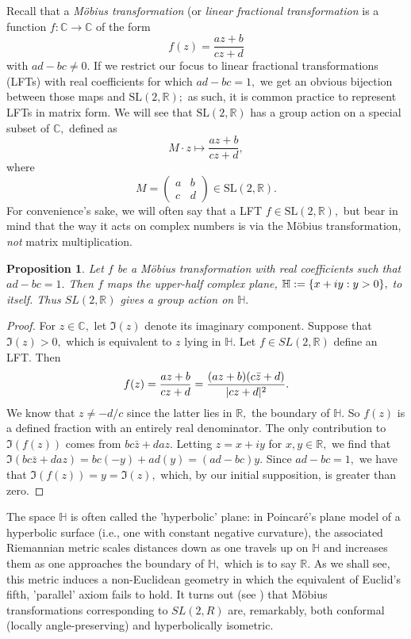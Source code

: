 \documentclass[12pt, letterpaper, oneside]{book}
\newcommand{\C}{\mathbb{C}}
\newcommand{\R}{\mathbb{R}}
\DeclarePairedDelimiter{\abs}{\lvert}{\rvert}
\DeclarePairedDelimiter{\set}{\lbrace}{\rbrace}
\theoremstyle{plain}
\newtheorem{tion}{Proposition}
\theoremstyle{definition}
\theoremstyle{remark}
\begin{document}
Recall that a \textit{M\"obius transformation} (or \textit{linear fractional transformation} is a function $f:\C \to \C$ of the form
\[
f(z) = \frac{az + b}{cz+d}
\]
with $ad - bc \neq 0.$  If we restrict our focus to linear fractional transformations (LFTs) with real coefficients for which $ad - bc = 1,$ we get an obvious bijection between those maps and $\mbox{SL}(2,\R);$ as such, it is common practice to represent LFTs in matrix form. We will see that $\mbox{SL}(2,\R)$ has a group action on a special subset of $\C,$ defined as
\[
M\cdot z \mapsto \frac{az + b}{cz+d},
\]
where
\[
M = \begin{pmatrix} a & b \\ c & d \end{pmatrix} \in \mbox{SL}(2,\R).
\]
For convenience's sake, we will often say that a LFT $f \in \mbox{SL}(2,\R),$ but bear in mind that the way it acts on complex numbers is via the M\"obius transformation, \textit{not} matrix multiplication.
\begin{tion}
Let $f$ be a M\"obius transformation with real coefficients such that $ad - bc = 1.$ Then $f$ maps the upper-half complex plane, $\mathbb{H} := \set{x + iy: y > 0},$ to itself. Thus $SL(2,\R)$ gives a group action on $\mathbb{H}.$
\end{tion}
\begin{proof}
For $z \in \C,$ let $\Im(z)$ denote its imaginary component. Suppose that $\Im(z) > 0,$ which is equivalent to $z$ lying in $\mathbb{H}.$ Let $f \in SL(2,\R)$ define an LFT. Then
\[
f(z) = \frac{az + b}{cz+d} = \frac{(az + b)(c\bar{z} + d)}{\abs{cz + d}^2}.
\]
We know that $z \neq -d/c$ since the latter lies in $\R,$ the boundary of $\mathbb{H}.$ So $f(z)$ is a defined fraction with an entirely real denominator. The only contribution to   $\Im(f(z))$ comes from $bc\bar{z} + daz.$ Letting $z = x + iy$ for $x,y \in \R,$ we find that $\Im(bc\bar{z} + daz) = bc(-y) + ad(y) = (ad - bc)y.$  Since $ad - bc = 1,$ we have that $\Im(f(z)) = y = \Im(z),$ which, by our initial supposition, is greater than zero.
\end{proof}

The space $\mathbb{H}$ is often called the 'hyperbolic' plane: in Poincar\'e's plane model of a hyperbolic surface (i.e., one with constant negative curvature), the associated Riemannian metric scales distances down as one travels up on $\mathbb{H}$ and increases them as one approaches the boundary of $\mathbb{H},$ which is to say $\R.$ As we shall see, this metric induces a non-Euclidean geometry in which the equivalent of Euclid's fifth, 'parallel' axiom fails to hold. It turns out (see \cite{ME11}) that M\"obius transformations corresponding to $SL(2,R)$ are, remarkably, both conformal (locally angle-preserving) and hyperbolically isometric. 
\end{document}
